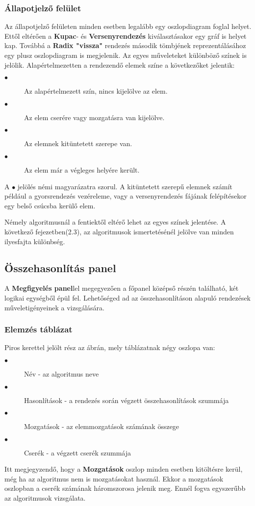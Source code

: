 \documentclass{elteikthesis}
\begin{document}
\subsubsection{Állapotjelző felület}
Az állapotjelző felületen minden esetben legalább egy oszlopdiagram foglal helyet. Ettől eltérően a \textbf{Kupac}- és \textbf{Versenyrendezés} kiválasztásakor egy gráf is helyet kap. Továbbá a \textbf{Radix "vissza"} rendezés második tömbjének reprezentálásához egy plusz oszlopdiagram is megjelenik. Az egyes műveleteket különböző színek is jelölik. Alapértelmezetten a rendezendő elemek színe a következőket jelentik:\par
\begin{description}
	\item[\textcolor{default}{\Huge$\bullet$}] Az alapértelmezett szín, nincs kijelölve az elem.
	\item[\textcolor{swap}{\Huge$\bullet$}] Az elem cserére vagy mozgatásra van kijelölve.
	\item[\textcolor{select}{\Huge$\bullet$}] Az elemnek kitüntetett szerepe van.
	\item[\textcolor{done}{\Huge$\bullet$}] Az elem már a végleges helyére került.
\end{description}
A \textcolor{select}{\Huge$\bullet$} jelölés némi magyarázatra szorul. A kitüntetett szerepű elemnek számít például a gyorsrendezés vezéreleme, vagy a versenyrendezés fájának felépítésekor egy belső csúcsba kerülő elem.\par
Némely algoritmusnál a fentiektől eltérő lehet az egyes színek jelentése. A következő fejezetben(2.3), az algoritmusok ismertetésénél jelölve van minden ilyesfajta különbség.
\subsection{Összehasonlítás panel}
A \textbf{Megfigyelés panel}lel megegyezően a főpanel középső részén található, két logikai egységből épül fel. Lehetőséged ad az összehasonlításon alapuló rendezések műveletigényeinek a vizsgálására.
\subsubsection{Elemzés táblázat}
Piros kerettel jelölt rész az ábrán, mely táblázatnak négy oszlopa van:
\begin{description}
	\item[$\bullet$] Név - az algoritmus neve
	\item[$\bullet$] Hasonlítások - a rendezés során végzett összehasonlítások szummája
	\item[$\bullet$] Mozgatások - az elemmozgatások számának összege
	\item[$\bullet$] Cserék - a végzett cserék szummája
\end{description}
Itt megjegyzendő, hogy a \textbf{Mozgatások} oszlop minden esetben kitöltésre kerül, még ha az algoritmus nem is mozgatásokat használ. Ekkor a mozgatások oszlopban a cserék számának háromszorosa jelenik meg. Ennél fogva egyszerűbb az algoritmusok vizsgálata.
\end{document}
